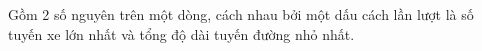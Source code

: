 Gồm 2 số nguyên trên một dòng, cách nhau bởi một dấu cách lần lượt là số tuyến xe lớn nhất và tổng độ dài tuyến đường nhỏ nhất.